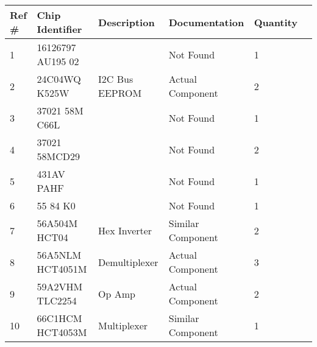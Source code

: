 \documentclass[]{formalLabReport}
\begin{document}
\begin{center}

\begin{table}[]
    \begin{tabular}{|l|l|l|l|l|l|}
    \hline
    Ref \# & Chip Identifier                          & Description                                & Documentation & Quantity \\ \hline
    1                & 16126797 AU195 02               &                                            & Not Found              & 1        \\ \hline
    2                & 24C04WQ K525W                            & I2C Bus EEPROM                             & Actual Component        & 2        \\ \hline
    3                & 37021 58M C66L                           &                                            & Not Found               & 1        \\ \hline
    4                & 37021 58MCD29                            &                                            & Not Found               & 2        \\ \hline
    5                & 431AV PAHF                               &                                            & Not Found               & 1        \\ \hline
    6                & 55 84 K0                                 &                                            & Not Found               & 1        \\ \hline
    7                & 56A504M HCT04                            & Hex Inverter                               & Similar Component       & 2        \\ \hline
    8                & 56A5NLM HCT4051M                         & Demultiplexer                   & Actual Component        & 3        \\ \hline
    9                & 59A2VHM TLC2254                          & Op Amp              & Actual Component        & 2        \\ \hline
    10               & 66C1HCM HCT4053M                         & Multiplexer  & Similar Component       & 1        \\ \hline

\end{tabular}
\end{table}
\end{center}
\end{document}
